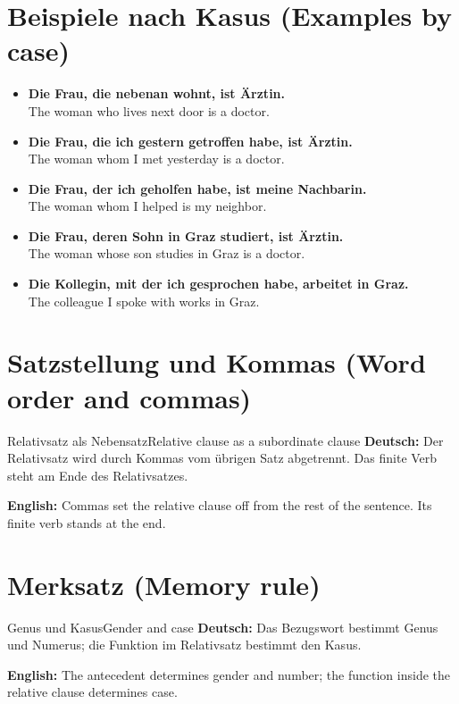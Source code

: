 \documentclass[a4paper,11pt]{article}
\newcommand{\GermanText}[1]{\textbf{Deutsch: }#1\par}
\newcommand{\EnglishText}[1]{{\small\color{SoftGray}\textbf{English: }#1\par}}
\newcommand{\ExampleItem}[2]{\item \textbf{#1}\\{\small\color{SoftGray}#2}}
\begin{document}
\section{Beispiele nach Kasus (Examples by case)}
\begin{exbox}\begin{itemize}
\ExampleItem{Die Frau, die nebenan wohnt, ist Ärztin.}{The woman who lives next door is a doctor.}
\ExampleItem{Die Frau, die ich gestern getroffen habe, ist Ärztin.}{The woman whom I met yesterday is a doctor.}
\ExampleItem{Die Frau, der ich geholfen habe, ist meine Nachbarin.}{The woman whom I helped is my neighbor.}
\ExampleItem{Die Frau, deren Sohn in Graz studiert, ist Ärztin.}{The woman whose son studies in Graz is a doctor.}
\ExampleItem{Die Kollegin, mit der ich gesprochen habe, arbeitet in Graz.}{The colleague I spoke with works in Graz.}
\end{itemize}\end{exbox}

\section{Satzstellung und Kommas (Word order and commas)}
\begin{grammarentry}{Relativsatz als Nebensatz}{Relative clause as a subordinate clause}
\GermanText{Der Relativsatz wird durch Kommas vom übrigen Satz abgetrennt. Das finite Verb steht am Ende des Relativsatzes.}
\EnglishText{Commas set the relative clause off from the rest of the sentence. Its finite verb stands at the end.}
\end{grammarentry}

\section{Merksatz (Memory rule)}
\begin{grammarentry}{Genus und Kasus}{Gender and case}
\GermanText{Das Bezugswort bestimmt Genus und Numerus; die Funktion im Relativsatz bestimmt den Kasus.}
\EnglishText{The antecedent determines gender and number; the function inside the relative clause determines case.}
\end{grammarentry}
\end{document}

